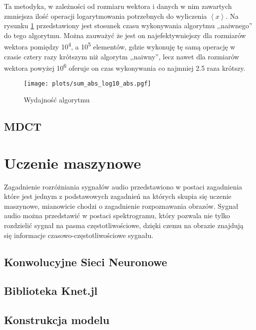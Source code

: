 \documentclass[pl,12pt]{aghdpl}
\let\Oldsection\section%
\renewcommand{\section}{\FloatBarrier\Oldsection}
\let\Oldsubsection\subsection%
\renewcommand{\subsection}{\FloatBarrier\Oldsubsection}
\begin{document}
Ta metodyka, w zależności od rozmiaru wektora i danych w nim zawartych
zmniejsza ilość operacji logarytmowania potrzebnych do wyliczenia
$\left<x\right>$. Na rysunku \ref{fig:sum_abs_log_abs} przedstawiony jest
stosunek czasu wykonywania algorytmu ,,naiwnego'' do tego algorytmu. Można
zauważyć że jest on najefektywniejszy dla rozmiarów wektora pomiędzy
10\textsuperscript{4}, a 10\textsuperscript{5} elementów, gdzie wykonuję tę samą
operację w czasie cztery razy krótszym niż algorytm ,,naiwny'', lecz nawet dla
rozmiarów wektora powyżej 10\textsuperscript{6} oferuje on czas wykonywania co
najmniej \num{2.5} raza krótszy.
\begin{figure}[!tbh]
  \centering
  \texttt{[image: plots/sum\_abs\_log10\_abs.pgf]}
  \caption{Wydajność algorytmu}
  \label{fig:sum_abs_log_abs}
\end{figure}

\subsection{MDCT}
\section{Uczenie maszynowe}
Zagadnienie rozróżniania sygnałów audio przedstawiono w postaci zagadnienia
które jest jednym z podstawowych zagadnień na których skupia się uczenie
maszynowe, mianowicie chodzi o zagadnienie rozpoznawania obrazów. Sygnał audio
można przedstawić w postaci spektrogramu, który pozwala nie tylko rozdzielić
sygnał na pasma częstotliwościowe, dzięki czemu na obrazie znajdują się
informacje czasowo-częstotliwościowe sygnału.
\subsection{Konwolucyjne Sieci Neuronowe}

\subsection{Biblioteka Knet.jl}
\subsection{Konstrukcja modelu}
\end{document}

